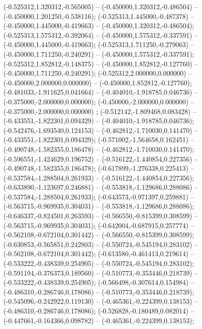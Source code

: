  (-0.525312,1.320312,-0.565005) -- (-0.450000,1.320312,-0.486504) -- (-0.450000,1.201250,-0.538116);
 (-0.525313,1.445000,-0.487378) -- (-0.450000,1.445000,-0.419663) -- (-0.450000,1.320312,-0.486504);
 (-0.525313,1.575312,-0.392064) -- (-0.450000,1.575312,-0.337591) -- (-0.450000,1.445000,-0.419663);
 (-0.525313,1.711250,-0.279063) -- (-0.450000,1.711250,-0.240291) -- (-0.450000,1.575312,-0.337591);
 (-0.525312,1.852812,-0.148375) -- (-0.450000,1.852812,-0.127760) -- (-0.450000,1.711250,-0.240291);
 (-0.525312,2.000000,0.000000) -- (-0.450000,2.000000,0.000000) -- (-0.450000,1.852812,-0.127760);
 (-0.481033,-1.911625,0.041664) -- (-0.404010,-1.918785,0.046736) -- (-0.375000,-2.000000,0.000000);
 (-0.450000,-2.000000,0.000000) -- (-0.375000,-2.000000,0.000000) ;
 (-0.512142,-1.809468,0.083428) -- (-0.433551,-1.822301,0.094329) -- (-0.404010,-1.918785,0.046736);
 (-0.542476,-1.693540,0.124153) -- (-0.462812,-1.710030,0.141470) -- (-0.433551,-1.822301,0.094329);
 (-0.571002,-1.564658,0.162451) -- (-0.490748,-1.582355,0.186478) -- (-0.462812,-1.710030,0.141470);
 (-0.596551,-1.424629,0.196752) -- (-0.516122,-1.440854,0.227356) -- (-0.490748,-1.582355,0.186478);
 (-0.617899,-1.276338,0.225413) -- (-0.537584,-1.288504,0.261933) -- (-0.516122,-1.440854,0.227356);
 (-0.633890,-1.123697,0.246881) -- (-0.553818,-1.129686,0.288086) -- (-0.537584,-1.288504,0.261933);
 (-0.643573,-0.971397,0.259881) -- (-0.563715,-0.969935,0.304031) -- (-0.553818,-1.129686,0.288086);
 (-0.646337,-0.824501,0.263593) -- (-0.566550,-0.815399,0.308599) -- (-0.563715,-0.969935,0.304031);
 (-0.642004,-0.687915,0.257774) -- (-0.562108,-0.672104,0.301442) -- (-0.566550,-0.815399,0.308599);
 (-0.630853,-0.565851,0.242803) -- (-0.550724,-0.545194,0.283102) -- (-0.562108,-0.672104,0.301442);
 (-0.613580,-0.461413,0.219614) -- (-0.533222,-0.438339,0.254905) -- (-0.550724,-0.545194,0.283102);
 (-0.591194,-0.376373,0.189560) -- (-0.510773,-0.353446,0.218739) -- (-0.533222,-0.438339,0.254905);
 (-0.566498,-0.307614,0.154984) -- (-0.486310,-0.286746,0.178086) -- (-0.510773,-0.353446,0.218739);
 (-0.545096,-0.242922,0.119130) -- (-0.465361,-0.224399,0.138153) -- (-0.486310,-0.286746,0.178086);
 (-0.526828,-0.180489,0.082014) -- (-0.447661,-0.164366,0.098782) -- (-0.465361,-0.224399,0.138153);
